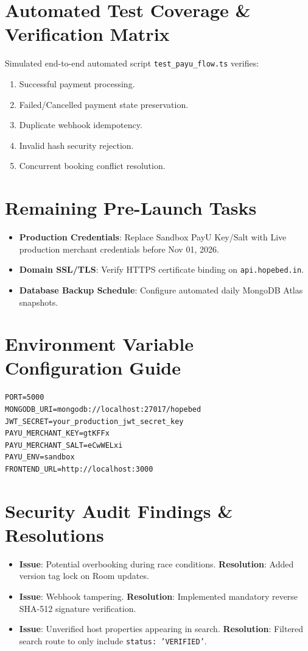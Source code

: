 \documentclass[11pt,a4paper]{article}
\begin{document}
\section{Automated Test Coverage \& Verification Matrix}
Simulated end-to-end automated script \texttt{test\_payu\_flow.ts} verifies:
\begin{enumerate}
    \item Successful payment processing.
    \item Failed/Cancelled payment state preservation.
    \item Duplicate webhook idempotency.
    \item Invalid hash security rejection.
    \item Concurrent booking conflict resolution.
\end{enumerate}

\section{Remaining Pre-Launch Tasks}
\begin{itemize}
    \item \textbf{Production Credentials}: Replace Sandbox PayU Key/Salt with Live production merchant credentials before Nov 01, 2026.
    \item \textbf{Domain SSL/TLS}: Verify HTTPS certificate binding on \texttt{api.hopebed.in}.
    \item \textbf{Database Backup Schedule}: Configure automated daily MongoDB Atlas snapshots.
\end{itemize}

\section{Environment Variable Configuration Guide}
\begin{verbatim}
PORT=5000
MONGODB_URI=mongodb://localhost:27017/hopebed
JWT_SECRET=your_production_jwt_secret_key
PAYU_MERCHANT_KEY=gtKFFx
PAYU_MERCHANT_SALT=eCwWELxi
PAYU_ENV=sandbox
FRONTEND_URL=http://localhost:3000
\end{verbatim}

\section{Security Audit Findings \& Resolutions}
\begin{itemize}
    \item \textbf{Issue}: Potential overbooking during race conditions. \textbf{Resolution}: Added version tag lock on Room updates.
    \item \textbf{Issue}: Webhook tampering. \textbf{Resolution}: Implemented mandatory reverse SHA-512 signature verification.
    \item \textbf{Issue}: Unverified host properties appearing in search. \textbf{Resolution}: Filtered search route to only include \texttt{status: 'VERIFIED'}.
\end{itemize}
\end{document}
